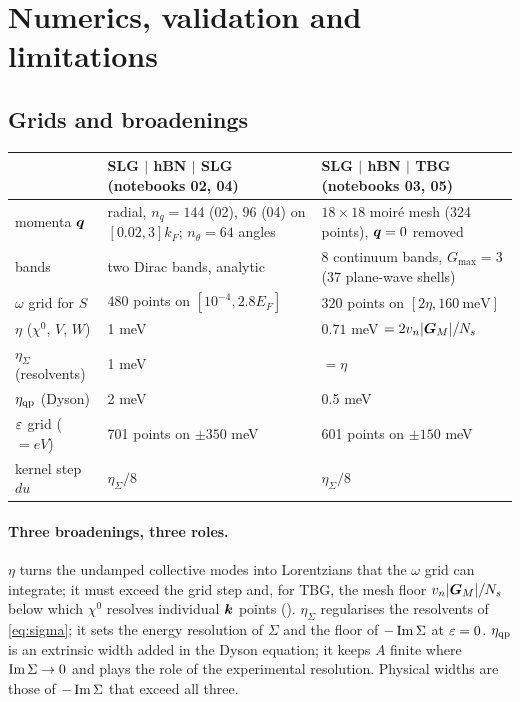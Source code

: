 \section{Numerics, validation and limitations}
\label{sec:numerics}

\subsection{Grids and broadenings}

\begin{center}
\small
\begin{tabularx}{\textwidth}{lXX}
\toprule
& SLG $|$ hBN $|$ SLG (notebooks 02, 04) & SLG $|$ hBN $|$ TBG (notebooks 03, 05)\\
\midrule
momenta $\bm q$ & radial, $n_q=144$ (02), $96$ (04) on $[0.02,3]k_F$; $n_\theta=64$ angles & $18\times18$ moir\'e mesh (324 points), $\bm q=0$ removed\\
bands & two Dirac bands, analytic & $8$ continuum bands, $G_{\max}=3$ (37 plane-wave shells)\\
$\omega$ grid for $S$ & $480$ points on $[10^{-4},2.8E_F]$ & $320$ points on $[2\eta,160\ \text{meV}]$\\
$\eta$ ($\chi^0$, $V$, $W$) & 1 meV & $0.71$ meV $=2v_n|\bm G_M|/N_s$\\
$\eta_\Sigma$ (resolvents) & 1 meV & $=\eta$\\
$\eta_{\rm qp}$ (Dyson) & 2 meV & 0.5 meV\\
$\varepsilon$ grid ($=eV$) & 701 points on $\pm350$ meV & 601 points on $\pm150$ meV\\
kernel step $du$ & $\eta_\Sigma/8$ & $\eta_\Sigma/8$\\
\bottomrule
\end{tabularx}
\end{center}

\paragraph{Three broadenings, three roles.} $\eta$ turns the undamped collective modes into Lorentzians that the
$\omega$ grid can integrate; it must exceed the grid step and, for TBG, the mesh floor $v_n|\bm G_M|/N_s$ below which
$\chi^0$ resolves individual $\bm k$ points (). $\eta_\Sigma$ regularises the resolvents of
\cref{eq:sigma}; it sets the energy resolution of $\Sigma$ and the floor of $-\operatorname{Im}\Sigma$ at $\varepsilon=0$. $\eta_{\rm qp}$ is
an extrinsic width added in the Dyson equation; it keeps $A$ finite where $\operatorname{Im}\Sigma\to0$ and plays the role of
the experimental resolution. Physical widths are those of $-\operatorname{Im}\Sigma$ that exceed all three.

